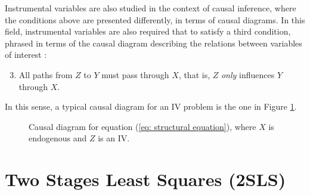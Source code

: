 Instrumental variables are also studied in the context of causal inference, where the conditions above are presented differently, in terms of causal diagrams.
In this field, instrumental variables are also required that to satisfy a third condition, phrased in terms of the causal diagram describing the relations between variables of interest \cite{hernan2020}:
\begin{enumerate}
    \setcounter{enumi}{2}
    \item All paths from $ Z $ to $ Y $ must pass through $ X $, that is, $ Z $ \emph{only} influences $ Y $ through $ X $.
\end{enumerate}
In this sense, a typical causal diagram for an IV problem is the one in Figure \ref{fig: causal diagram iv}.
\begin{figure}[t]
    \begin{center}
    \end{center}
    \caption{Causal diagram for equation (\ref{eq: structural equation}), where $ X $ is endogenous and $ Z $ is an IV.}
    \label{fig: causal diagram iv}
\end{figure}

\section{Two Stages Least Squares (2SLS)}


